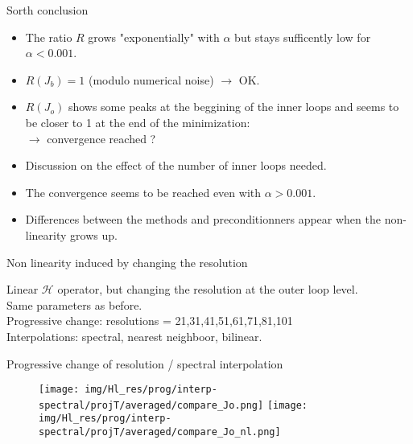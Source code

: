 \documentclass[francais]{beamer}
\begin{document}
\begin{frame}{Sorth conclusion}
\begin{itemize}
\item The ratio $R$ grows "exponentially" with $\alpha$ but stays sufficently low for $\alpha<0.001$.\\
\item $R(J_b) = 1$ (modulo numerical noise) $\longrightarrow$ OK.
\item $R(J_o)$ shows some peaks at the beggining of the inner loops and seems to be closer to 1 at the end of the minimization:\\
$\longrightarrow$ convergence reached ?
\item Discussion on the effect of the number of inner loops needed.
\item The convergence seems to be reached even with $\alpha>0.001$.
\item Differences between the methods and preconditionners appear when the non-linearity grows up.
\end{itemize}
\end{frame}


\begin{frame}{Non linearity induced by changing the resolution}
\begin{center}
Linear $\mathcal{H}$ operator, but changing the resolution at the outer loop level.\\
Same parameters as before.\\
Progressive change: resolutions = 21,31,41,51,61,71,81,101\\
Interpolations: spectral, nearest neighboor, bilinear.\\
\end{center}
\end{frame}

\begin{frame}{Progressive change of resolution / spectral interpolation}
\begin{center}
\begin{figure}
  \texttt{[image: img/Hl\_res/prog/interp-spectral/projT/averaged/compare\_Jo.png]}
\endminipage\hfill
{}
  \texttt{[image: img/Hl\_res/prog/interp-spectral/projT/averaged/compare\_Jo\_nl.png]}
\endminipage
\end{figure}
\end{center}
\end{frame}
\end{document}
